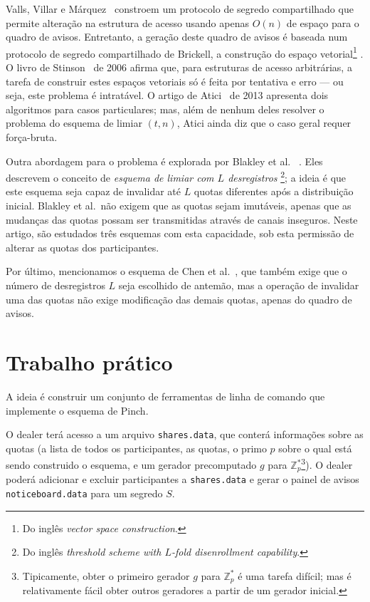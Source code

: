 \documentclass[10pt,twocolumn]{article}
\theoremstyle{definition}
\begin{document}
Valls, Villar e Márquez~\cite{VallsVillarMarquez1999}
constroem um protocolo de segredo compartilhado
que permite alteração na estrutura de acesso
usando apenas $O(n)$ de espaço para o quadro de avisos.
Entretanto,
a geração deste quadro de avisos é baseada
num protocolo de segredo compartilhado de Brickell,
a construção do espaço vetorial\footnote{
    Do inglês \emph{vector space construction}.
}
\cite{Brickell1990}.
O livro de Stinson~\cite[p.~499]{Stinson2006} de 2006
afirma que, para estruturas de acesso arbitrárias,
a tarefa de construir estes espaços vetoriais
só é feita por tentativa e erro
--- ou seja, este problema é intratável.
O artigo de Atici~\cite{Atici2013} de 2013
apresenta dois algoritmos para casos particulares;
mas, além de nenhum deles resolver o problema do esquema de limiar $(t, n)$,
Atici ainda diz que o caso geral requer força-bruta.

Outra abordagem para o problema é explorada por Blakley et al.%
~\cite{BlakleyBlakleyChanMassey1993}.
Eles descrevem o conceito de \emph{esquema de limiar com $L$ desregistros}%
\footnote{
    Do inglês \emph{threshold scheme with $L$-fold disenrollment capability}.
};
a ideia é que este esquema
seja capaz de invalidar até $L$ quotas diferentes após a distribuição inicial.
Blakley et al.\ não exigem que as quotas sejam imutáveis,
apenas que as mudanças das quotas possam ser transmitidas através de canais inseguros.
Neste artigo,
são estudados três esquemas com esta capacidade,
sob esta permissão de alterar as quotas dos participantes.

Por último,
mencionamos o esquema de Chen et al.~\cite{ChenGollmanMitchellWild1997},
que também exige que o número de desregistros $L$ seja escolhido de antemão,
mas a operação de invalidar uma das quotas
não exige modificação das demais quotas,
apenas do quadro de avisos.

\section{Trabalho prático}

A ideia é construir um conjunto de ferramentas de linha de comando
que implemente o esquema de Pinch.

O dealer terá acesso a um arquivo \verb"shares.data",
que conterá informações sobre as quotas
(a lista de todos os participantes,
as quotas, o primo $p$ sobre o qual está sendo construido
o esquema,
e um gerador precomputado $g$ para $\mathbb Z_p^*$\footnote{
    Tipicamente,
    obter o primeiro gerador $g$ para $\mathbb Z_p^*$
    é uma tarefa difícil;
    mas é relativamente fácil obter outros geradores
    a partir de um gerador inicial.
}).
O dealer poderá adicionar e excluir participantes a \verb"shares.data"
e gerar o painel de avisos \verb"noticeboard.data" para um segredo $S$.
\end{document}
